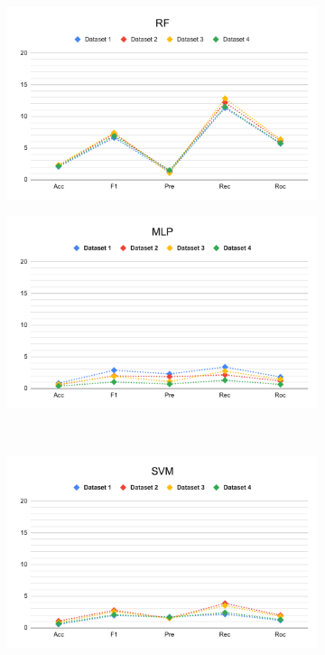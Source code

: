 \begin{figure}[H]
\begin{subfigure}{.5\columnwidth}
        \centering
        \includegraphics[width=0.9\columnwidth]{media/data/performance_delta/delta_RF.pdf}
        \caption{}
        \label{fig:perfromance_delta_rf}
    \end{subfigure}%
    \begin{subfigure}{.5\columnwidth}
        \centering
        \includegraphics[width=0.9\columnwidth]{media/data/performance_delta/delta_MLP.pdf}
        \caption{}
        \label{fig:perfromance_delta_mlp}
    \end{subfigure}\\%
    \begin{subfigure}{.5\columnwidth}
        \centering
        \includegraphics[width=0.9\columnwidth]{media/data/performance_delta/delta_SVM.pdf}

\end{subfigure}
\end{figure}
